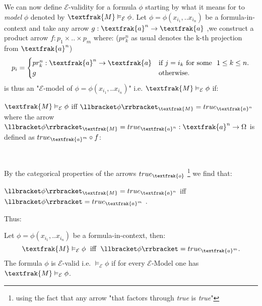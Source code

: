 We can now define $\mathcal{E}$-validity for a formula $\phi$ starting by what it means for  to \emph{model} $\phi$ denoted by $\textfrak{M} \vDash_\mathcal{E} \phi$. \newline
Let $\phi = \phi(x_{i_1},..x_{i_n})$ be a formula-in-context and take any arrow $g: \textfrak{a}^n \rightarrow \textfrak{a}$ 	,we construct a product arrow $f: p_1 \times .. \times p_m$ where: ($pr_k^n$ as usual denotes the k-th projection from $\textfrak{a}^n$)
\begin{equation*}
	p_i =
	\begin{cases}
			pr_k^n : \textfrak{a}^n \rightarrow \textfrak{a} & \text{if } j=i_k \text{ for some } \  1 \leq k \leq n.\\
			g  & \text{otherwise}.
		\end{cases}   
\end{equation*}  
 is thus an "$\mathcal{E}$-model of $\phi = \phi(x_{i_1},..x_{i_n})$" i.e. $\textfrak{M} \vDash_\mathcal{E} \phi$ if:
\newpage

\begin{definition}
	$\textfrak{M} \vDash_\mathcal{E} \phi$ iff $\llbracket \phi \rrbracket_\textfrak{M} = true_{\textfrak{a}^n}$ \newline
	where the arrow $\llbracket \phi \rrbracket_\textfrak{M} = true_{\textfrak{a}^n} : \textfrak{a}^n \rightarrow \Omega$ is defined as $ true_{\textfrak{a}^m} \circ f$:
	\begin{figure}[h]
			\centering
			\
		\end{figure}
\end{definition}

By the categorical properties of the arrows $true_\textfrak{o}$ \footnote{using the fact that any arrow "that factors through \emph{true} is \emph{true}"} we find that:

\begin{remark}
	$\llbracket \phi \rrbracket_\textfrak{M} = true_{\textfrak{a}^n}$ iff $\llbracket \phi \rrbracket = true_{\textfrak{a}^m}$ .
\end{remark}
Thus:
\begin{definition}[$\mathcal{E}$-validity] Let $\phi = \phi(x_{i_1},..x_{i_n})$ be a formula-in-context,	then: 
	\begin{equation*}
			\textfrak{M} \vDash_\mathcal{E} \phi \;\text{	iff	}\; \llbracket \phi \rrbracket = true_{\textfrak{a}^m} .
		\end{equation*}
	The formula $\phi$ is $\mathcal{E}$-valid i.e. $ \vDash_\mathcal{E} \phi $ if for every $\mathcal{E}$-Model  one has $ \textfrak{M}\vDash_\mathcal{E} \phi $.
\end{definition}

